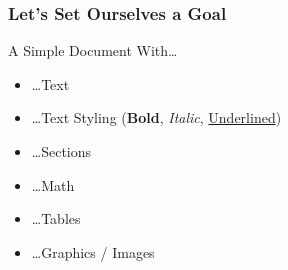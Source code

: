 \begin{frame}
    \frametitle{Let's Set Ourselves a Goal}
    A Simple Document With\ldots
    \begin{itemize}
        \item<+-> \ldots Text
        \item<+-> \ldots Text Styling (\textbf{Bold}, \textit{Italic}, \underline{Underlined})
        \item<+-> \ldots Sections
        \item<+-> \ldots Math
        \item<+-> \ldots Tables
        \item<+-> \ldots Graphics / Images
    \end{itemize}
\end{frame}